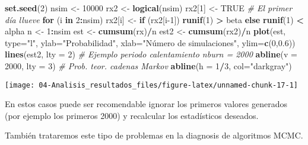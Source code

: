 \documentclass[
]{book}
\newenvironment{Shaded}{\begin{snugshade}}{\end{snugshade}}
\newcommand{\CommentTok}[1]{\textcolor[rgb]{0.56,0.35,0.01}{\textit{#1}}}
\newcommand{\ControlFlowTok}[1]{\textcolor[rgb]{0.13,0.29,0.53}{\textbf{#1}}}
\newcommand{\DataTypeTok}[1]{\textcolor[rgb]{0.13,0.29,0.53}{#1}}
\newcommand{\DecValTok}[1]{\textcolor[rgb]{0.00,0.00,0.81}{#1}}
\newcommand{\FloatTok}[1]{\textcolor[rgb]{0.00,0.00,0.81}{#1}}
\newcommand{\KeywordTok}[1]{\textcolor[rgb]{0.13,0.29,0.53}{\textbf{#1}}}
\newcommand{\NormalTok}[1]{#1}
\newcommand{\OperatorTok}[1]{\textcolor[rgb]{0.81,0.36,0.00}{\textbf{#1}}}
\newcommand{\OtherTok}[1]{\textcolor[rgb]{0.56,0.35,0.01}{#1}}
\newcommand{\StringTok}[1]{\textcolor[rgb]{0.31,0.60,0.02}{#1}}
\theoremstyle{break}
\theoremstyle{definition}
\theoremstyle{definition}
\theoremstyle{definition}
\theoremstyle{remark}
\begin{document}
\begin{Shaded}
\begin{Highlighting}[]
\KeywordTok{set.seed}\NormalTok{(}\DecValTok{2}\NormalTok{)}
\NormalTok{nsim <-}\StringTok{ }\DecValTok{10000}
\NormalTok{rx2 <-}\StringTok{ }\KeywordTok{logical}\NormalTok{(nsim)}
\NormalTok{rx2[}\DecValTok{1}\NormalTok{] <-}\StringTok{ }\OtherTok{TRUE} \CommentTok{# El primer día llueve}
\ControlFlowTok{for}\NormalTok{ (i }\ControlFlowTok{in} \DecValTok{2}\OperatorTok{:}\NormalTok{nsim)}
\NormalTok{  rx2[i] <-}\StringTok{ }\ControlFlowTok{if}\NormalTok{ (rx2[i}\DecValTok{-1}\NormalTok{]) }\KeywordTok{runif}\NormalTok{(}\DecValTok{1}\NormalTok{) }\OperatorTok{>}\StringTok{ }\NormalTok{beta }\ControlFlowTok{else} \KeywordTok{runif}\NormalTok{(}\DecValTok{1}\NormalTok{) }\OperatorTok{<}\StringTok{ }\NormalTok{alpha}
\NormalTok{n <-}\StringTok{ }\DecValTok{1}\OperatorTok{:}\NormalTok{nsim}
\NormalTok{est <-}\StringTok{ }\KeywordTok{cumsum}\NormalTok{(rx)}\OperatorTok{/}\NormalTok{n}
\NormalTok{est2 <-}\StringTok{ }\KeywordTok{cumsum}\NormalTok{(rx2)}\OperatorTok{/}\NormalTok{n}
\KeywordTok{plot}\NormalTok{(est, }\DataTypeTok{type=}\StringTok{"l"}\NormalTok{, }\DataTypeTok{ylab=}\StringTok{"Probabilidad"}\NormalTok{, }
     \DataTypeTok{xlab=}\StringTok{"Número de simulaciones"}\NormalTok{, }\DataTypeTok{ylim=}\KeywordTok{c}\NormalTok{(}\DecValTok{0}\NormalTok{,}\FloatTok{0.6}\NormalTok{))}
\KeywordTok{lines}\NormalTok{(est2, }\DataTypeTok{lty =} \DecValTok{2}\NormalTok{)}
\CommentTok{# Ejemplo periodo calentamiento nburn = 2000}
\KeywordTok{abline}\NormalTok{(}\DataTypeTok{v =} \DecValTok{2000}\NormalTok{, }\DataTypeTok{lty =} \DecValTok{3}\NormalTok{)}
\CommentTok{# Prob. teor. cadenas Markov}
\KeywordTok{abline}\NormalTok{(}\DataTypeTok{h =} \DecValTok{1}\OperatorTok{/}\DecValTok{3}\NormalTok{, }\DataTypeTok{col=}\StringTok{"darkgray"}\NormalTok{)     }
\end{Highlighting}
\end{Shaded}

\begin{center}\texttt{[image: 04-Analisis\_resultados\_files/figure-latex/unnamed-chunk-17-1]} \end{center}

En estos casos puede ser recomendable ignorar los primeros valores generados (por ejemplo los primeros 2000) y recalcular los
estadísticos deseados.

También trataremos este tipo de problemas en la diagnosis de algoritmos MCMC.
\end{document}
